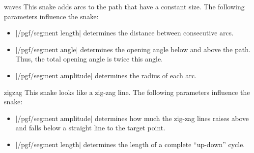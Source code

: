 \begin{snake}{waves}
  This snake adds arcs to the path that have a constant size. The
  following parameters influence the snake: 
  \begin{itemize}
  \item |/pgf/segment length|
    determines the distance between consecutive arcs.
  \item |/pgf/segment angle|
    determines the opening angle below and above the path. Thus, the
    total opening angle is twice this angle.
  \item |/pgf/segment amplitude|
    determines the radius of each arc.
  \end{itemize}
\begin{codeexample}[]
\end{codeexample}
\end{snake}


\begin{snake}{zigzag}
  This snake looks like a zig-zag line. The following parameters
  influence the snake:
  \begin{itemize}
  \item |/pgf/segment amplitude|
    determines how much the zig-zag lines raises above and falls below
    a straight line to the target point.
  \item |/pgf/segment length|
    determines the length of a complete ``up-down'' cycle.
  \end{itemize}
\begin{codeexample}[]
\end{codeexample}
\end{snake}



